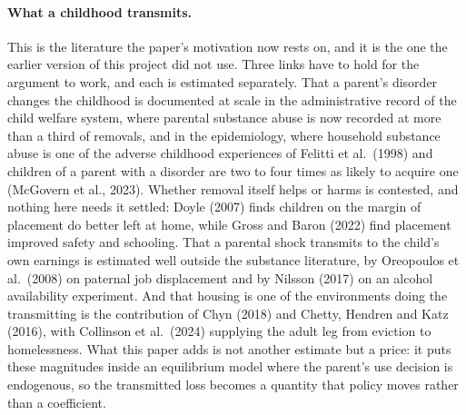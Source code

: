 \documentclass[10pt]{article}
\begin{document}
\paragraph{What a childhood transmits.} This is the literature the paper's
motivation now rests on, and it is the one the earlier version of this project did
not use. Three links have to hold for the argument to work, and each is estimated
separately. That a parent's disorder changes the childhood is documented at scale in
the administrative record of the child welfare system, where parental substance
abuse is now recorded at more than a third of removals, and in the epidemiology,
where household substance abuse is one of the adverse childhood experiences of
Felitti et al.\ (1998) and children of a parent with a disorder are two to four
times as likely to acquire one (McGovern et al., 2023). Whether removal itself helps
or harms is contested, and nothing here needs it settled: Doyle (2007) finds
children on the margin of placement do better left at home, while Gross and Baron
(2022) find placement improved safety and schooling. That a parental shock transmits
to the child's own earnings is estimated well outside the substance literature, by
Oreopoulos et al.\ (2008) on paternal job displacement and by Nilsson
(2017) on an alcohol availability experiment. And that housing is one of the
environments doing the transmitting is the contribution of Chyn (2018) and Chetty,
Hendren and Katz (2016), with Collinson et al.\ (2024) supplying the adult leg from
eviction to homelessness. What this paper adds is not another estimate but a price:
it puts these magnitudes inside an equilibrium model where the parent's use decision
is endogenous, so the transmitted loss becomes a quantity that policy moves rather
than a coefficient.
\end{document}
